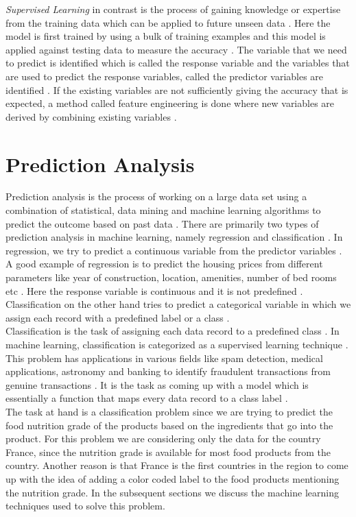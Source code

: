 \documentclass[sigconf]{acmart}
\begin{document}
{\em Supervised Learning} in contrast is the process of gaining knowledge or expertise from the training data which can be applied to future unseen data \cite{book-shai}. Here the model is first trained by using a bulk of training examples and this model is applied against testing data to measure the accuracy \cite{book-shai}. The variable that we need to predict is identified which is called the response variable and the variables that are used to predict the response variables, called the predictor variables are identified \cite{book-shai}. If the existing variables are not sufficiently giving the accuracy that is expected, a method called feature engineering is done where new variables are derived by combining existing variables \cite{book-shai}. 

\section{Prediction Analysis}
Prediction analysis is the process of working on  a large data set using a combination of statistical, data mining and machine learning algorithms to predict the outcome based on past data \cite{book-shai}.
There are primarily two types of prediction analysis in machine learning, namely regression and classification \cite{book-tan}. In regression, we try to predict a continuous variable from the predictor variables \cite{book-tan}. A good example of regression is to predict the housing prices from different parameters like year of construction, location, amenities, number of bed rooms etc \cite{book-tan}. Here the response variable is continuous and it is not predefined \cite{book-tan}. Classification on the other hand tries to predict a categorical variable in which we assign each record with a predefined label or a class \cite{book-tan}. \\

Classification is the task of assigning each data record to a predefined class \cite{book-tan}. In machine learning, classification is categorized as a supervised learning technique \cite{book-tan}. This problem has applications in various fields like spam detection, medical applications, astronomy and banking to identify fraudulent transactions from genuine transactions \cite{book-tan}. It is the task as coming up with a model which is essentially a function that maps every data record to a class label \cite{book-tan}. \\ 

The task at hand is a classification problem since we are trying to predict the food nutrition grade of the products based on the ingredients that go into the product. For this problem we are considering only the data for the country France, since the nutrition grade is available for most food products from the country. Another reason is that France is the first countries in the region to come up with the idea of adding a color coded label to the food products mentioning the nutrition grade. In the subsequent sections we discuss the machine learning techniques used to solve this problem.
\end{document}
